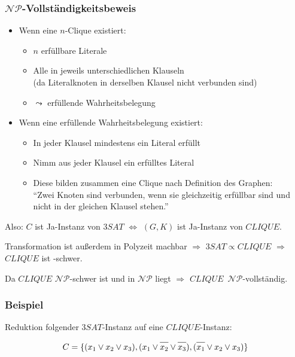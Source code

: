 \begin{frame}
\frametitle{$\mathcal{NP}$-Vollständigkeitsbeweis}
\begin{itemize}
\item Wenn eine $n$-Clique existiert:
\begin{itemize}
	\item $n$ erfüllbare Literale
	\item Alle in jeweils unterschiedlichen Klauseln \\ \small{(da Literalknoten in derselben Klausel nicht verbunden sind)}
	\item $\leadsto$ erfüllende Wahrheitsbelegung
\end{itemize}
\pause \item Wenn eine erfüllende Wahrheitsbelegung existiert:
\begin{itemize}
	\item In jeder Klausel mindestens ein Literal erfüllt
	\item Nimm aus jeder Klausel ein erfülltes Literal
	\item Diese bilden zusammen eine Clique nach Definition des Graphen: \\ \small{"`Zwei Knoten sind verbunden, wenn sie gleichzeitig erfüllbar sind und nicht in der gleichen Klausel stehen."'}
\end{itemize}
\end{itemize}

\pause

Also: $C$ ist Ja-Instanz von $3SAT$ $\Leftrightarrow$ $(G,K)$ ist Ja-Instanz von $CLIQUE$.

\pause

\ducttape{.3cm}

Transformation ist außerdem in Polyzeit machbar $\Rightarrow$ $3SAT \propto CLIQUE$ $\Rightarrow$ $CLIQUE$ ist \classNP{}-schwer.

\pause

\ducttape{.3cm}

Da $CLIQUE$ $\mathcal{NP}$-schwer ist und in $\mathcal{NP}$ liegt $\Rightarrow$ $CLIQUE$~$\mathcal{NP}$-vollständig.
\end{frame}

\begin{frame}
	\frametitle{Beispiel}
	
	Reduktion folgender $3SAT$-Instanz auf eine $CLIQUE$-Instanz:
	
	$$C = \{ (x_1 \vee x_2 \vee x_3), (x_1 \vee \neglit{x_2} \vee \neglit{x_3}), (\neglit{x_1} \vee x_2 \vee x_3) \}$$
\end{frame}

